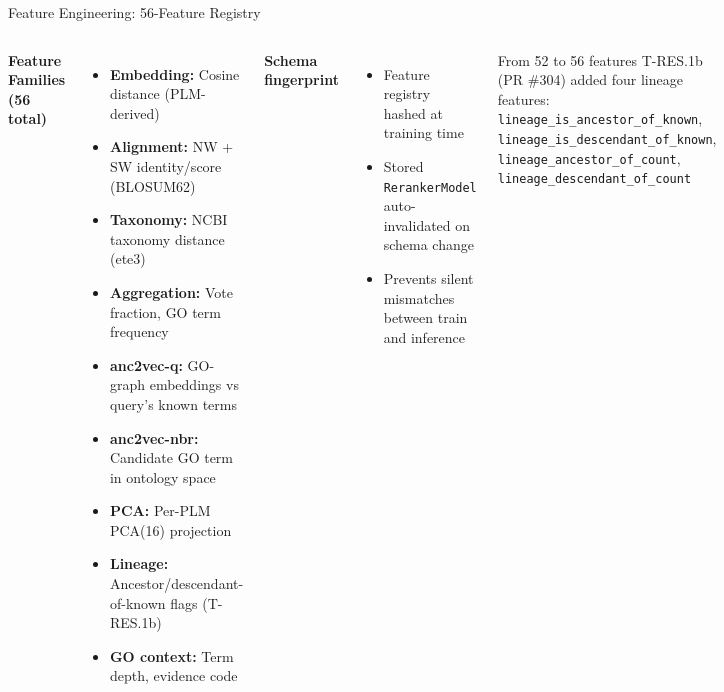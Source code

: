 \documentclass[12pt, aspectratio=169]{beamer}
\begin{document}
\begin{frame}{Feature Engineering: 56-Feature Registry}
  \begin{columns}[t]
      \textbf{Feature Families (56 total)}
      \begin{itemize}
        \item[\textbullet] \textbf{Embedding:} Cosine distance (PLM-derived)
        \item[\textbullet] \textbf{Alignment:} NW + SW identity/score (BLOSUM62)
        \item[\textbullet] \textbf{Taxonomy:} NCBI taxonomy distance (ete3)
        \item[\textbullet] \textbf{Aggregation:} Vote fraction, GO term frequency
        \item[\textbullet] \textbf{anc2vec-q:} GO-graph embeddings vs query's known terms
        \item[\textbullet] \textbf{anc2vec-nbr:} Candidate GO term in ontology space
        \item[\textbullet] \textbf{PCA:} Per-PLM PCA(16) projection
        \item[\textbullet] \textbf{Lineage:} Ancestor/descendant-of-known flags (T-RES.1b)
        \item[\textbullet] \textbf{GO context:} Term depth, evidence code
      \end{itemize}
      \textbf{Schema fingerprint}
      \begin{itemize}
        \item Feature registry hashed at training time
        \item Stored \texttt{RerankerModel} auto-invalidated on schema change
        \item Prevents silent mismatches between train and inference
      \end{itemize}
      \vspace{0.5em}
      \begin{block}{From 52 to 56 features}
        T-RES.1b (PR \#304) added four lineage features:
        \texttt{lineage\_is\_ancestor\_of\_known},
        \texttt{lineage\_is\_descendant\_of\_known},
        \texttt{lineage\_ancestor\_of\_count},
        \texttt{lineage\_descendant\_of\_count}
      \end{block}
  \end{columns}
\end{frame}
\end{document}
